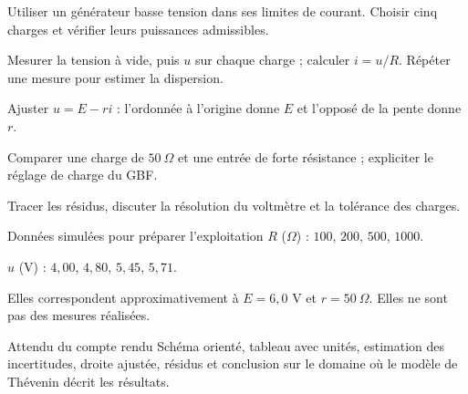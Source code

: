 \begin{questions}
\item Utiliser un générateur basse tension dans ses limites de courant. Choisir cinq charges et vérifier leurs puissances admissibles.
\item Mesurer la tension à vide, puis $u$ sur chaque charge ; calculer $i=u/R$. Répéter une mesure pour estimer la dispersion.
\item Ajuster $u=E-ri$ : l’ordonnée à l’origine donne $E$ et l’opposé de la pente donne $r$.
\item Comparer une charge de $50\ \Omega$ et une entrée de forte résistance ; expliciter le réglage de charge du GBF.
\item Tracer les résidus, discuter la résolution du voltmètre et la tolérance des charges.
\end{questions}
\begin{docu}{Données simulées pour préparer l’exploitation}
$R$ ($\Omega$) : $100$, $200$, $500$, $1000$.\par $u$ (V) : $4{,}00$, $4{,}80$, $5{,}45$, $5{,}71$.\par Elles correspondent approximativement à $E=6{,}0$ V et $r=50\ \Omega$. Elles ne sont pas des mesures réalisées.
\end{docu}
\begin{methode}{Attendu du compte rendu}
Schéma orienté, tableau avec unités, estimation des incertitudes, droite ajustée, résidus et conclusion sur le domaine où le modèle de Thévenin décrit les résultats.
\end{methode}


